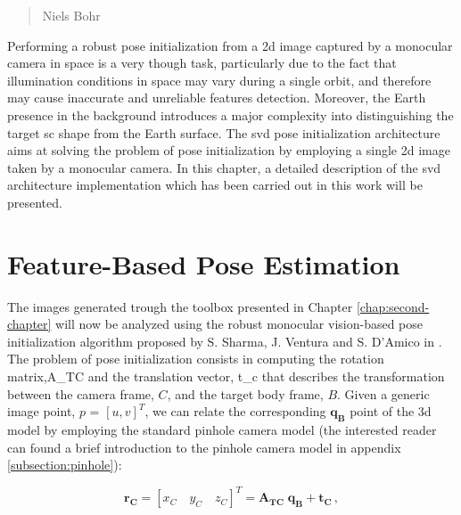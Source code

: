 \begin{quotation}
  {\footnotesize
    \begin{flushright}
      Niels Bohr
    \end{flushright}
  }
\end{quotation}
\vspace{0.5cm}

Performing a robust pose initialization from a \acrshort{2d} image captured by a monocular camera in space is a very though task, particularly due to the fact that illumination conditions in space may vary during a single orbit, and therefore may cause inaccurate and unreliable features detection. Moreover, the Earth presence in the background introduces a major complexity into distinguishing the target \acrshort{sc} shape from the Earth surface. The \acrshort{svd} pose initialization architecture aims at solving the problem of pose initialization by employing a single \acrshort{2d} image taken by a monocular camera. In this chapter, a detailed description of the \acrshort{svd} architecture implementation which has been carried out in this work will be presented.

\section{Feature-Based Pose Estimation}
The images generated  trough the toolbox presented in Chapter \ref{chap:second-chapter} will now be analyzed using the robust monocular vision-based pose initialization algorithm proposed by S. Sharma, J. Ventura and S. D'Amico in \cite{Sharma2018}.
The problem of pose initialization consists in computing the rotation matrix,\gls{A_TC} and the translation vector, \gls{t_c} that describes the transformation between the camera frame, $C$, and the target body frame, $B$. Given a generic image point, $p$ = $ [u,v]^T $, we can relate the corresponding $\mathbf{q_B}$ point of the \acrshort{3d} model by employing the standard pinhole camera model (the interested reader can found a brief introduction to the pinhole camera model in appendix \ref{subsection:pinhole}):

\begin{equation}
  \mathbf{r_C} = \left[x_C \quad  y_C \quad z_C\right]^T = \mathbf{A_{TC}} \; \mathbf{q_B} + \mathbf{t_C} \,,
  \label{eq:rc}
\end{equation}

